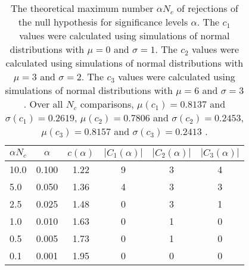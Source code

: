 \begin{table}[h!]
\begin{center}
\begin{tabular}{| l | c | c | c | c | c |}\hline
$\alpha N_c$ & $\alpha$ & $c(\alpha)$ & $|C_1(\alpha)|$ & $|C_2(\alpha)|$ & $|C_3(\alpha)|$ \\\hline\hline
10.0 & 0.100 & 1.22 & 9 & 3 & 4 \\\hline
5.0 & 0.050 & 1.36 & 4 & 3 & 3 \\\hline
2.5 & 0.025 & 1.48 & 0 & 3 & 1 \\\hline
1.0 & 0.010 & 1.63 & 0 & 1 & 0 \\\hline
0.5 & 0.005 & 1.73 & 0 & 1 & 0 \\\hline
0.1 & 0.001 & 1.95 & 0 & 0 & 0 \\\hline
\end{tabular}
\caption{The theoretical maximum number $\alpha N_c$ of rejections
of the null hypothesis for significance levels $\alpha$.
The $c_1$ values were calculated using simulations of normal distributions with $\mu=0$ and $\sigma=1$.
The $c_2$ values were calculated using simulations of normal distributions with $\mu=3$ and $\sigma=2$.
The $c_3$ values were calculated using simulations of normal distributions with $\mu=6$ and $\sigma=3$.
Over all $N_c$ comparisons,
 $\mu(c_1)=0.8137$ and $\sigma(c_1)=0.2619$,
 $\mu(c_2)=0.7806$ and $\sigma(c_2)=0.2453$,
 $\mu(c_3)=0.8157$ and $\sigma(c_3)=0.2413$ .
}
\end{center}
\end{table}